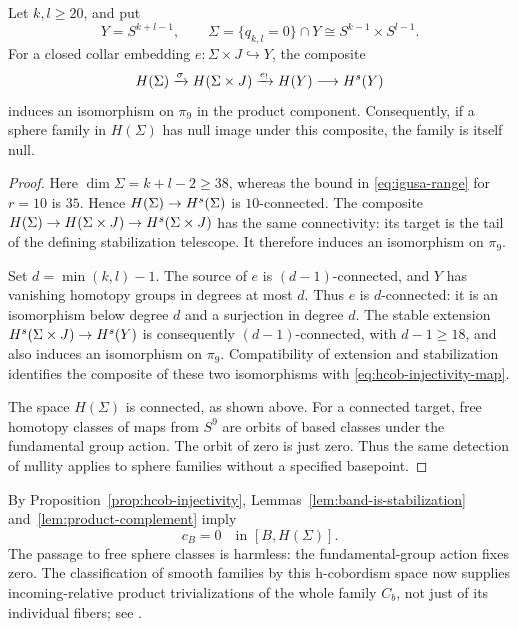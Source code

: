 \begin{proposition}\label{prop:hcob-injectivity}
Let $k,l\geq20$, and put
\[
 Y=S^{k+l-1},\qquad
 \Sigma=\{q_{k,l}=0\}\cap Y\cong S^{k-1}\times S^{l-1}.
\]
For a closed collar embedding $e:\Sigma\times J\hookrightarrow Y$, the
composite
\begin{equation}\label{eq:hcob-injectivity-map}
 H(\Sigma)\xrightarrow{\sigma}H(\Sigma\times J)
 \xrightarrow{e_!}H(Y)\longrightarrow H^s(Y)
\end{equation}
induces an isomorphism on $\pi_9$ in the product component. Consequently,
if a sphere family in $H(\Sigma)$ has null image under this composite,
the family is itself null.
\end{proposition}

\begin{proof}
Here $\dim\Sigma=k+l-2\geq38$, whereas the bound in
\eqref{eq:igusa-range} for $r=10$ is $35$. Hence
$H(\Sigma)\to H^s(\Sigma)$ is $10$-connected. The composite
$H(\Sigma)\to H(\Sigma\times J)\to H^s(\Sigma\times J)$ has the same
connectivity: its target is the tail of the defining stabilization
telescope. It therefore induces an isomorphism on $\pi_9$.

Set $d=\min(k,l)-1$. The source of $e$ is $(d-1)$-connected, and
$Y$ has vanishing homotopy groups in degrees at most $d$. Thus $e$ is
$d$-connected: it is an isomorphism below degree $d$ and a surjection in
degree $d$. The stable extension
$H^s(\Sigma\times J)\to H^s(Y)$ is consequently $(d-1)$-connected,
with $d-1\geq18$, and also induces an isomorphism on $\pi_9$.
Compatibility of extension and stabilization identifies the composite of
these two isomorphisms with \eqref{eq:hcob-injectivity-map}.

The space $H(\Sigma)$ is connected, as shown above.
For a connected target, free homotopy classes of maps from $S^9$ are
orbits of based classes under the fundamental group action. The orbit
of zero is just zero. Thus the same detection of nullity applies to
sphere families without a specified basepoint.
\end{proof}

By Proposition~\ref{prop:hcob-injectivity}, Lemmas~\ref{lem:band-is-stabilization} and~\ref{lem:product-complement} imply
\begin{equation}\label{eq:zero-cobordism-class}
 c_B=0\quad\text{in }[B,H(\Sigma)].
\end{equation}
The passage to free sphere classes is harmless: the fundamental-group action fixes zero. The classification of smooth families by this h-cobordism space now supplies incoming-relative product trivializations of the whole family $C_b$, not just of its individual fibers; see \cite[Proposition~2.11]{CP2025}.

